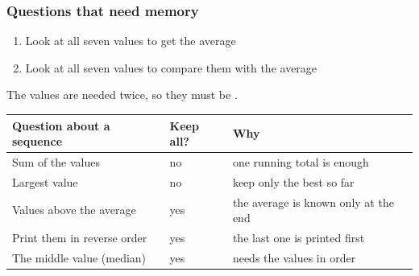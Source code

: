 \documentclass[aspectratio=169,10pt,compress]{beamer}
\begin{document}
\begin{frame}[t,fragile] \frametitle{Questions that need memory}

	\begin{enumerate}
		\item Look at all seven values to get the average
		\item Look at all seven values  to compare them with the average
	\end{enumerate}
	The values are needed twice, so they must be .

	\vspace{0.5em}


\begin{table}
		\small
		\begin{tabular}{@{}L{0.42\textwidth}L{0.18\textwidth}L{0.32\textwidth}@{}}
			\toprule
			\textbf{Question about a sequence} & \textbf{Keep all?} & \textbf{Why} \\
			\midrule
			Sum of the values             & no  & one running total is enough \\
			Largest value                 & no  & keep only the best so far \\
			Values above the average      & yes & the average is known only at the end \\
			Print them in reverse order   & yes & the last one is printed first \\
			The middle value (median)     & yes & needs the values in order \\
			\bottomrule
		\end{tabular}
\end{table}%
\end{frame}




\end{document}

